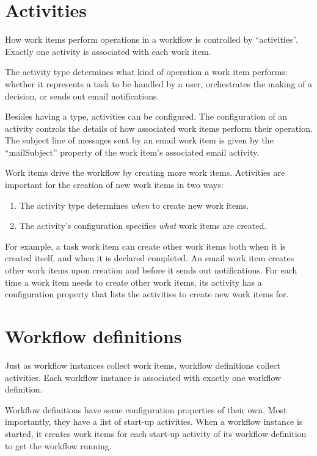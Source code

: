 \section{Activities}

How work items perform operations in a workflow is controlled by ``activities''.
Exactly one activity is associated with each work item.

The activity type determines what kind of operation a work
item performs: whether it represents a task to be handled by a user,
orchestrates the making of a decision, or sends out email notifications.

Besides having a type, activities can be configured. The configuration of an
activity controls the details of how associated work items perform their
operation. The subject line of messages sent by an email work item is given by
the ``mailSubject'' property of the work item's associated email activity.

Work items drive the workflow by creating more work items. Activities are
important for the creation of new work items in two ways:

\begin{enumerate}
    \item The activity type determines \emph{when} to create new work items.
    \item The activity's configuration specifies \emph{what} work items are created.
\end{enumerate}

For example, a task work item can create other work items both when it is
created itself, and when it is declared completed. An email work item creates
other work items upon creation and before it sends out notifications. For each
time a work item needs to create other work items, its activity has a
configuration property that lists the activities to create new work items for.

\section{Workflow definitions}

Just as workflow instances collect work items, workflow definitions collect
activities. Each workflow instance is associated with exactly one workflow
definition.

Workflow definitions have some configuration properties of their own. Most
importantly, they have a list of start-up activities. When a workflow instance
is started, it creates work items for each start-up activity of its workflow
definition to get the workflow running.

